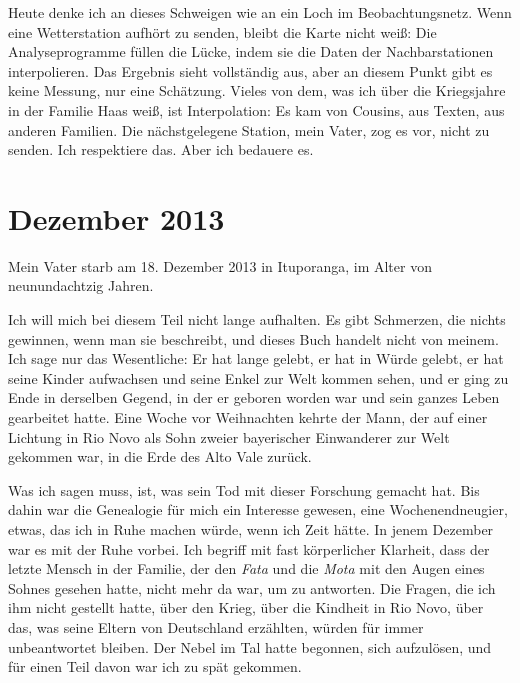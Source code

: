 \documentclass[
  ngerman,
  11pt,
  openany]{book}
\begin{document}
Heute denke ich an dieses Schweigen wie an ein Loch im Beobachtungsnetz.
Wenn eine Wetterstation aufhört zu senden, bleibt die Karte nicht weiß:
Die Analyseprogramme füllen die Lücke, indem sie die Daten der
Nachbarstationen interpolieren. Das Ergebnis sieht vollständig aus, aber
an diesem Punkt gibt es keine Messung, nur eine Schätzung. Vieles von
dem, was ich über die Kriegsjahre in der Familie Haas weiß, ist
Interpolation: Es kam von Cousins, aus Texten, aus anderen Familien. Die
nächstgelegene Station, mein Vater, zog es vor, nicht zu senden. Ich
respektiere das. Aber ich bedauere es.

\section{Dezember 2013}\label{dezember-2013}

Mein Vater starb am 18. Dezember 2013 in Ituporanga, im Alter von
neunundachtzig Jahren.

Ich will mich bei diesem Teil nicht lange aufhalten. Es gibt Schmerzen,
die nichts gewinnen, wenn man sie beschreibt, und dieses Buch handelt
nicht von meinem. Ich sage nur das Wesentliche: Er hat lange gelebt, er
hat in Würde gelebt, er hat seine Kinder aufwachsen und seine Enkel zur
Welt kommen sehen, und er ging zu Ende in derselben Gegend, in der er
geboren worden war und sein ganzes Leben gearbeitet hatte. Eine Woche
vor Weihnachten kehrte der Mann, der auf einer Lichtung in Rio Novo als
Sohn zweier bayerischer Einwanderer zur Welt gekommen war, in die Erde
des Alto Vale zurück.

Was ich sagen muss, ist, was sein Tod mit dieser Forschung gemacht hat.
Bis dahin war die Genealogie für mich ein Interesse gewesen, eine
Wochenendneugier, etwas, das ich in Ruhe machen würde, wenn ich Zeit
hätte. In jenem Dezember war es mit der Ruhe vorbei. Ich begriff mit
fast körperlicher Klarheit, dass der letzte Mensch in der Familie, der
den \emph{Fata} und die \emph{Mota} mit den Augen eines Sohnes gesehen
hatte, nicht mehr da war, um zu antworten. Die Fragen, die ich ihm nicht
gestellt hatte, über den Krieg, über die Kindheit in Rio Novo, über das,
was seine Eltern von Deutschland erzählten, würden für immer
unbeantwortet bleiben. Der Nebel im Tal hatte begonnen, sich aufzulösen,
und für einen Teil davon war ich zu spät gekommen.
\end{document}
